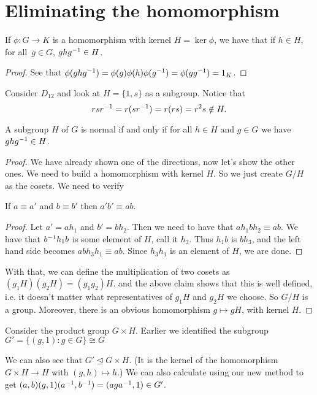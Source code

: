 \documentclass[11pt]{scrreport}
\begin{document}
\section{Eliminating the homomorphism}
\begin{proposition}
    If $\phi : G\to K$ is a homomorphism with kernel $H = \ker\phi$, we have that if $h\in H$, for all $g\in G$, $ghg^{-1} \in H$.
\end{proposition}
\begin{proof}
    See that $\phi(ghg^{-1}) = \phi(g)\phi(h)\phi(g^{-1})=\phi(gg^{-1})=1_K$.
\end{proof}
\begin{example}
    Consider $D_{12}$ and look at $H=\{1,s\}$ as a subgroup. Notice that
    \[rsr^{-1} = r(sr^{-1}) = r(rs)=r^2s\notin H.\]
\end{example}
\begin{theorem}
    A subgroup $H$ of $G$ is normal if and only if for all $h\in H$ and $g\in G$ we have $ghg^{-1} \in H$.
\end{theorem}
\begin{proof}
    We have already shown one of the directions, now let's show the other ones. We need to build a homomorphism with kernel $H$. So we just create $G/H$ as the cosets. We need to verify
    \begin{lemma}
        If $a\equiv a'$ and $b\equiv b'$ then $a'b'\equiv ab$.
    \end{lemma}
    \begin{proof}
        Let $a'=ah_1$ and $b'=bh_2$. Then we need to have that $ah_1bh_2 \equiv ab$. We have that $b^{-1} h_1b$ is some element of $H$, call it $h_3$. Thus $h_1b$ is $bh_3$, and the left hand side becomes $abh_3h_1 \equiv ab$. Since $h_3h_1$ is an element of $H$, we are done.
    \end{proof}
    With that, we can define the multiplication of two cosets as $(g_1H)(g_2H)=(g_1g_2)H$. and the above claim shows that this is well defined, i.e. it doesn't matter what representatives of $g_1H$ and $g_2H$ we choose. So $G/H$ is a group. Moreover, there is an obvious homomorphism $g\mapsto gH$, with kernel $H$.
\end{proof}
\begin{example}
    Consider the product group $G\times H$. Earlier we identified the subgroup $G' = \{(g,1) : g\in G\} \cong G$

    We can also see that $G' \unlhd G\times H$. (It is the kernel of the homomorphism $G\times H \to H$ with $(g,h)\mapsto h$.) We can also calculate using our new method to get $(a,b)(g,1)(a^{-1}, b^{-1}) = (aga^{-1}, 1)\in G'$.
\end{example}
\end{document}
